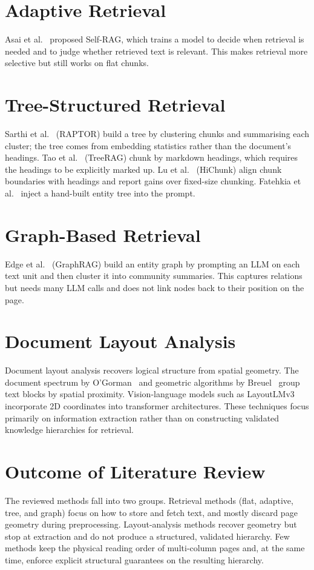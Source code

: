\documentclass[12pt,a4paper,twoside,openright]{report}
\begin{document}
\section{Adaptive Retrieval}
Asai et al.~\cite{asai2024selfrag} proposed Self-RAG, which trains a model to decide
when retrieval is needed and to judge whether retrieved text is relevant. This makes
retrieval more selective but still works on flat chunks.

\section{Tree-Structured Retrieval}
Sarthi et al.~\cite{sarthi2024raptor} (RAPTOR) build a tree by clustering chunks and
summarising each cluster; the tree comes from embedding statistics rather than the
document's headings. Tao et al.~\cite{tao2025treerag} (TreeRAG) chunk by markdown
headings, which requires the headings to be explicitly marked up. Lu et
al.~\cite{lu2026hichunk} (HiChunk) align chunk boundaries with headings and report
gains over fixed-size chunking. Fatehkia et al.~\cite{fatehkia2024trag} inject a
hand-built entity tree into the prompt.

\section{Graph-Based Retrieval}
Edge et al.~\cite{edge2024graphrag} (GraphRAG) build an entity graph by prompting an LLM
on each text unit and then cluster it into community summaries. This captures relations
but needs many LLM calls and does not link nodes back to their position on the page.

\section{Document Layout Analysis}
Document layout analysis recovers logical structure from spatial geometry. The document
spectrum by O'Gorman~\cite{ogorman1993document} and geometric algorithms by Breuel~\cite{breuel2002high}
group text blocks by spatial proximity. Vision-language models such as LayoutLMv3~\cite{huang2022layoutlmv3}
incorporate 2D coordinates into transformer architectures. These techniques focus primarily on
information extraction rather than on constructing validated knowledge hierarchies for retrieval.

\section{Outcome of Literature Review}
The reviewed methods fall into two groups. Retrieval methods (flat, adaptive, tree, and
graph) focus on how to store and fetch text, and mostly discard page geometry during
preprocessing. Layout-analysis methods recover geometry but stop at extraction and do
not produce a structured, validated hierarchy. Few methods keep the physical reading
order of multi-column pages and, at the same time, enforce explicit structural
guarantees on the resulting hierarchy.
\end{document}
